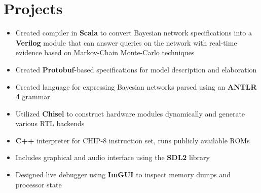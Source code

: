 \documentclass{moderncv}
\begin{document}
\begin{comment}
    \cventry{May 2019 - Aug 2019}{Secure Software Developer}{ESCRYPT}{Waterloo ON}{}
{\begin{itemize}
    \item Implemented asynchronous process in \textbf{C++} for periodically provisioning \textbf{X.509} certificates on-vehicle, improving anonymity in the system by enabling certificate swapping
    \item Wrote ETSI-compliant tests using \textbf{GoogleTest} framework to prove functionality
\end{itemize}}
\end{comment}

\section{Projects}
{\begin{itemize}
    \item Created compiler in \textbf{Scala} to convert Bayesian network specifications into a \textbf{Verilog} module that can answer queries on the network with real-time evidence based on Markov-Chain Monte-Carlo techniques
    \item Created \textbf{Protobuf}-based specifications for model description and elaboration
    \item Created language for expressing Bayesian networks parsed using an \textbf{ANTLR 4} grammar
    \item Utilized \textbf{Chisel} to construct hardware modules dynamically and generate various RTL backends
\end{itemize}}

{\begin{itemize}
    \item \textbf{C++} interpreter for CHIP-8 instruction set, runs publicly available ROMs
    \item Includes graphical and audio interface using the \textbf{SDL2} library
    \item Designed live debugger using \textbf{ImGUI} to inspect memory dumps and processor state
\end{itemize}}
\end{document}
